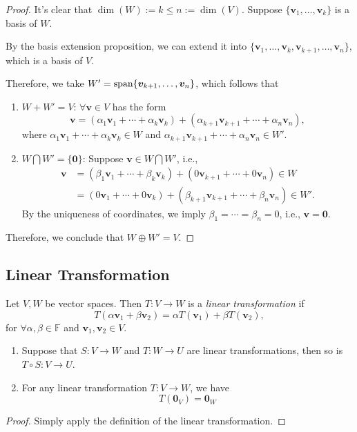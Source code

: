 \begin{proof}
It's clear that $\dim(W):=k\le n:=\dim(V)$. Suppose $\{\bm v_1,\dots,\bm v_k\}$ is a basis of $W$. 

By the basis extension proposition, we can extend it into $\{\bm v_1,\dots,\bm v_k,\bm v_{k+1},\dots,\bm v_n\}$, which is a basis of $V$.

Therefore, we take $W'=\operatorname{span}\{\bm v_{k+1},\dots,\bm v_n\}$, which follows that
\begin{enumerate}
\item
$W+W'=V$: $\forall\bm v \in V$ has the form 
\[
\bm v=
\left(
\alpha_1\bm v_1+\cdots+\alpha_k\bm v_k
\right)+\left(
\alpha_{k+1}\bm v_{k+1}+\cdots+\alpha_n\bm v_n
\right),
\]
where $\alpha_1\bm v_1+\cdots+\alpha_k\bm v_k\in W$ and $\alpha_{k+1}\bm v_{k+1}+\cdots+\alpha_n\bm v_n\in W'$.
\item
$W\bigcap W'=\{\bm0\}$: Suppose $\bm v\in W\bigcap W'$, i.e., 
\begin{align*}
\bm v&=
\left(
\beta_1\bm v_1+\cdots+\beta_k\bm v_k
\right)+
(0\bm v_{k+1}+\cdots+0\bm v_n)\in W\\
&=(0\bm v_1+\cdots+0\bm v_k)+\left(\beta_{k+1}\bm v_{k+1}+\cdots+\beta_n\bm v_n\right)\in W'.
\end{align*}
By the uniqueness of coordinates, we imply $\beta_1=\cdots=\beta_n=0$, i.e., $\bm v=\bm0$.
\end{enumerate}
Therefore, we conclude that $W\oplus W'=V$.
\end{proof}


\subsection{Linear Transformation}

\begin{definition}
Let $V,W$ be vector spaces. 
Then $T:V\to W$ is a \emph{linear transformation} if 
\[
T(\alpha\bm v_1+\beta\bm v_2)=\alpha  T(\bm v_1)+\beta T(\bm v_2),
\]
for $
\forall\alpha,\beta\in\mathbb{F}$ and $\bm v_1,\bm v_2\in V$.
\end{definition}

\begin{proposition}
\begin{enumerate}
\item
Suppose that $S:V\to W$ and $T:W\to U$ are linear transformations, then
so is $T\circ S:V\to U$.
\item
For any linear transformation $T:V\to W$, we have
\[
T(\bm 0_V)=\bm 0_W
\]
\end{enumerate}
\end{proposition}
\begin{proof}
Simply apply the definition of the linear transformation.
\end{proof}




